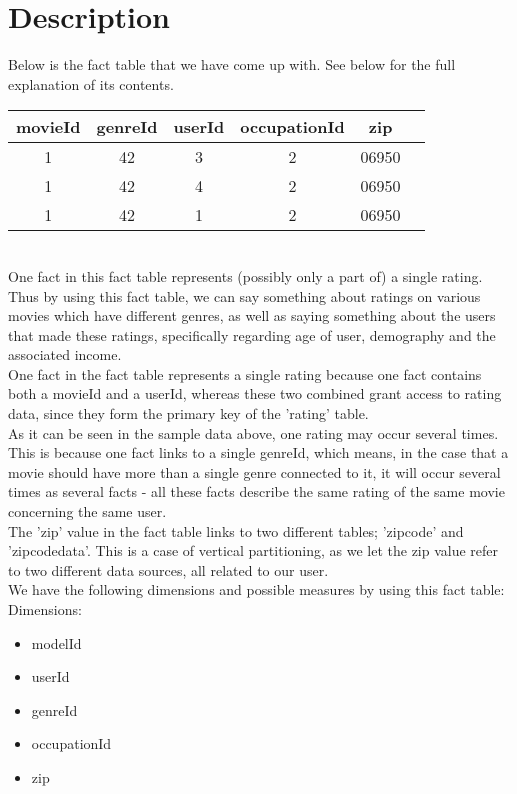 \section*{Description}
Below is the fact table that we have come up with. See below for the full explanation of its contents.

\begin{tabular}{ c | c | c | c | c | c }
  movieId & genreId & userId & occupationId & zip \\
  \hline
  1 & 42 & 3 & 2 & 06950 \\
  1 & 42 & 4 & 2 & 06950 \\
  1 & 42 & 1 & 2 & 06950 \\
  \hline  
\end{tabular} \\

\noindent One fact in this fact table represents (possibly only a part of) a single rating. Thus by using this fact table, we can say something about ratings on various movies which have different genres, as well as saying something about the users that made these ratings, specifically regarding age of user, demography and the associated income. \\
One fact in the fact table represents a single rating because one fact contains both a movieId and a userId, whereas these two combined grant access to rating data, since they form the primary key of the 'rating' table. \\
As it can be seen in the sample data above, one rating may occur several times. This is because one fact links to a single genreId, which means, in the case that a movie should have more than a single genre connected to it, it will occur several times as several facts - all these facts describe the same rating of the same movie concerning the same user. \\
The 'zip' value in the fact table links to two different tables; 'zipcode' and 'zipcodedata'. This is a case of vertical partitioning, as we let the zip value refer to two different data sources, all related to our user. \\

\noindent We have the following dimensions and possible measures by using this fact table: \\
Dimensions:

\begin{itemize}
  \item modelId
  \item userId
  \item genreId
  \item occupationId
  \item zip
\end{itemize}

